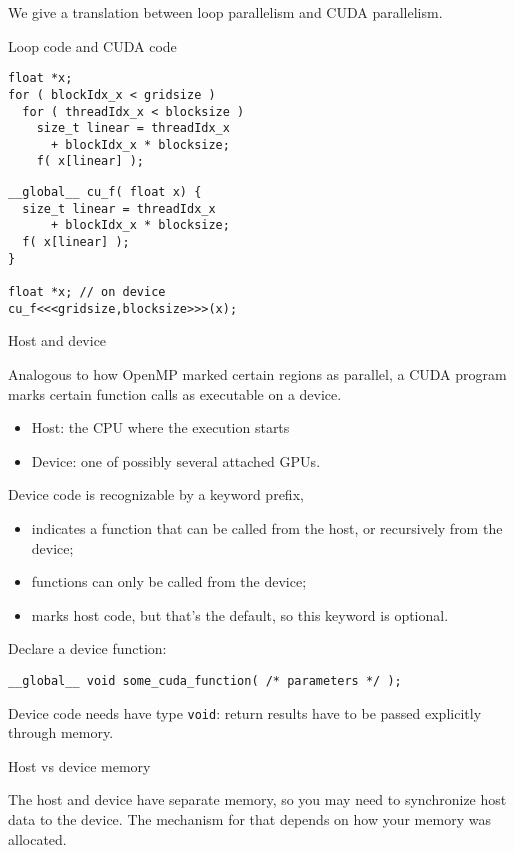 We give a translation between loop parallelism
and CUDA parallelism.

\begin{block}{Loop code and CUDA code}
  \label{sl:cuda-loop}
\begin{multicols}{2}
\begin{lstlisting}
float *x;
for ( blockIdx_x < gridsize )
  for ( threadIdx_x < blocksize )
    size_t linear = threadIdx_x
      + blockIdx_x * blocksize;
    f( x[linear] );
\end{lstlisting}
\columnbreak
\begin{lstlisting}
__global__ cu_f( float x) {
  size_t linear = threadIdx_x
      + blockIdx_x * blocksize;
  f( x[linear] );
}  

float *x; // on device
cu_f<<<gridsize,blocksize>>>(x);
\end{lstlisting}
\end{multicols}
\end{block}

 {Host and device}

Analogous to how OpenMP marked certain regions as parallel,
a \ac{CUDA} program marks certain function calls as
executable on a device.
\begin{itemize}
\item Host: the CPU where the execution starts
\item Device: one of possibly several attached \acp{GPU}.
\end{itemize}
Device code is recognizable by a keyword prefix,
\begin{itemize}
\item
   indicates a function that can be called from the host,
  or recursively from the device;
\item  {} functions can only be called from the device;
\item {} marks host code, but that's the default,
  so this keyword is optional.
\end{itemize}

Declare a device function:
\begin{lstlisting}
__global__ void some_cuda_function( /* parameters */ );
\end{lstlisting}
Device code needs have type \lstinline{void}:
return results have to be passed explicitly through memory.

 {Host vs device memory}

The host and device have separate memory, so you may need to
synchronize host data to the device.
The mechanism for that depends on how your memory was allocated.

